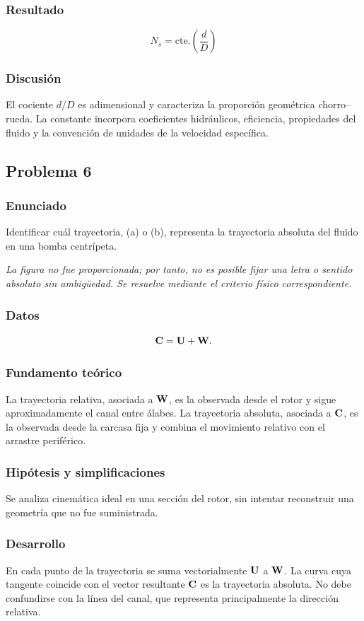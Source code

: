 \documentclass[12pt]{article}
\newcommand{\figuraFaltante}{\emph{La figura no fue proporcionada; por tanto, no es posible fijar una letra o sentido absoluto sin ambigüedad. Se resuelve mediante el criterio físico correspondiente.}}
\newcommand{\resultado}[1]{\[
  \boxed{\displaystyle #1}
\]}
\begin{document}
\subsubsection*{Resultado}
\resultado{N_s=\mathrm{cte.}\left(\frac{d}{D}\right)}

\subsubsection*{Discusión}
El cociente $d/D$ es adimensional y caracteriza la proporción geométrica chorro--rueda.
La constante incorpora coeficientes hidráulicos, eficiencia, propiedades del fluido y la
convención de unidades de la velocidad específica.

\subsection{Problema 6}

\subsubsection*{Enunciado}
Identificar cuál trayectoria, (a) o (b), representa la trayectoria absoluta del fluido en una
bomba centrípeta.

\figuraFaltante

\subsubsection*{Datos}
\[
\vb C=\vb U+\vb W.
\]

\subsubsection*{Fundamento teórico}
La trayectoria relativa, asociada a $\vb W$, es la observada desde el rotor y sigue
aproximadamente el canal entre álabes. La trayectoria absoluta, asociada a $\vb C$, es la
observada desde la carcasa fija y combina el movimiento relativo con el arrastre periférico.

\subsubsection*{Hipótesis y simplificaciones}
Se analiza cinemática ideal en una sección del rotor, sin intentar reconstruir una geometría
que no fue suministrada.

\subsubsection*{Desarrollo}
En cada punto de la trayectoria se suma vectorialmente $\vb U$ a $\vb W$. La curva cuya
tangente coincide con el vector resultante $\vb C$ es la trayectoria absoluta. No debe
confundirse con la línea del canal, que representa principalmente la dirección relativa.
\end{document}
